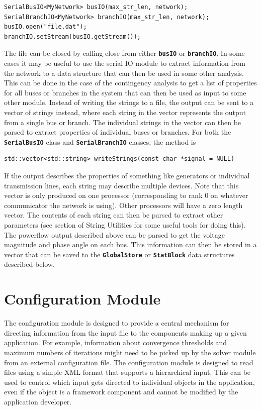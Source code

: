 \documentclass[12pt]{report} %
\begin{document}
{
\color{red}
\begin{Verbatim}[fontseries=b]
SerialBusIO<MyNetwork> busIO(max_str_len, network);
SerialBranchIO<MyNetwork> branchIO(max_str_len, network);
busIO.open("file.dat");
branchIO.setStream(busIO.getStream());
\end{Verbatim}
}

The file can be closed by calling close from either \texttt{\textbf{busIO}} or \texttt{\textbf{branchIO}}.
In some cases it may be useful to use the serial IO module to extract information from the network to a data structure that can then be used in some other analysis. This can be done in the case of the contingency analysis to get a list of properties for all buses or branches in the system that can then be used as input to some other module. Instead of writing the strings to a file, the output can be sent to a vector of strings instead, where each string in the vector represents the output from a single bus or branch. The individual strings in the vector can then be parsed to extract properties of individual buses or branches. For both the \texttt{\textbf{SerialBusIO}} class and \texttt{\textbf{SerialBranchIO}} classes, the method is

{
\color{red}
\begin{Verbatim}[fontseries=b]
std::vector<std::string> writeStrings(const char *signal = NULL)
\end{Verbatim}
}

If the output describes the properties of something like generators or individual transmission lines, each string may describe multiple devices. Note that this vector is only produced on one processor (corresponding to rank 0 on whatever communicator the network is using). Other processors will have a zero length vector. The contents of each string can then be parsed to extract other parameters (see section of String Utilities for some useful tools for doing this). The powerflow output described above can be parsed to get the voltage magnitude and phase angle on each bus. This information can then be stored in a vector that can be saved to the \texttt{\textbf{GlobalStore}} or \texttt{\textbf{StatBlock}} data structures described below.

\section{Configuration Module }

The configuration module is designed to provide a central mechanism for directing information from the input file to the components making up a given application. For example, information about convergence thresholds and maximum numbers of iterations might need to be picked up by the solver module from an external configuration file. The configuration module is designed to read files using a simple XML format that supports a hierarchical input. This can be used to control which input gets directed to individual objects in the application, even if the object is a framework component and cannot be modified by the application developer.
\end{document}
